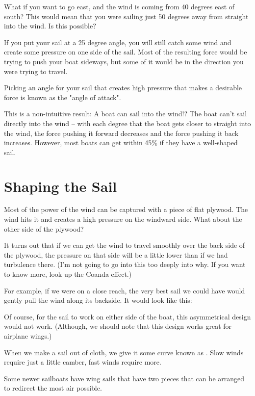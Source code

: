 What if you want to go east,  and the wind is coming from 40 degrees east of south?  This would mean that you were sailing just 50 degrees away from 
straight into the wind.   Is this possible?

If you put your sail at a 25 degree angle,   you will still catch some wind and create some pressure on one side of the sail.  Most of the resulting force would be trying to push
your boat sideways,  but some of it would be in the direction you were trying to travel. 

Picking an angle for your sail that creates high pressure that makes a desirable force is known as the "angle of attack".

This is a non-intuitive result: A boat can sail into the wind!?  The boat can't sail directly into the wind -- with each degree that the boat gets closer
to straight into the wind,  the force pushing it forward decreases and the force pushing it back increases.   However,  most boats can get within 45\% if they have a well-shaped sail.

\section{Shaping the Sail}

Most of the power of the wind can be captured with a piece of flat plywood.  The wind hits it and creates a high pressure on the windward side.   What about the other side of the plywood?

It turns out that if we can get the wind to travel smoothly over the back side of the plywood,   the pressure on that side will be a little lower than if we had turbulence there.   (I'm not going
to go into this too deeply into why.  If you want to know more,  look up the Coanda effect.)

For example,   if we were on a close reach,   the very best sail we could have would gently pull the wind along its backside.  It would look like this:

Of course,   for the sail to work on either side of the boat,  this asymmetrical design would not work.  (Although,  we should note that this design works great
for airplane wings.)

When we make a sail out of cloth,  we give it some curve known as .  Slow winds require just a little camber,  fast winds require more.

Some newer sailboats have wing sails that have two pieces that can be arranged to redirect the most air possible.

